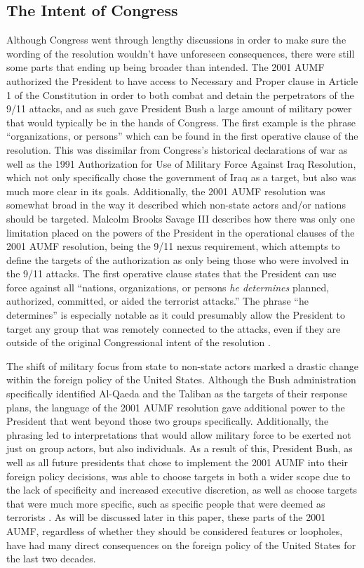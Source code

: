 \documentclass[12pt]{article}
\begin{document}
\subsection*{The Intent of Congress}
Although Congress went through lengthy discussions in order to make sure the wording of the resolution wouldn't have unforeseen consequences, there were still some parts that ending up being broader than intended.
The 2001 AUMF authorized the President to have access to Necessary and Proper clause in Article 1 of the Constitution in order to both combat and detain the perpetrators of the 9/11 attacks, and as such gave President Bush a large amount of military power that would typically be in the hands of Congress.
The first example is the phrase ``organizations, or persons'' which can be found in the first operative clause of the resolution.
This was dissimilar from Congress's historical declarations of war as well as the 1991 Authorization for Use of Military Force Against Iraq Resolution, which not only specifically chose the government of Iraq as a target, but also was much more clear in its goals.
Additionally, the 2001 AUMF resolution was somewhat broad in the way it described which non-state actors and/or nations should be targeted.
Malcolm Brooks Savage III describes how there was only one limitation placed on the powers of the President in the operational clauses of the 2001 AUMF resolution, being the 9/11 nexus requirement, which attempts to define the targets of the authorization as only being those who were involved in the 9/11 attacks.
The first operative clause states that the President can use force against all ``nations, organizations, or persons \emph{he determines} planned, authorized, committed, or aided the terrorist attacks.''
The phrase ``he determines'' is especially notable as it could presumably allow the President to target any group that was remotely connected to the attacks, even if they are outside of the original Congressional intent of the resolution \autocite[5]{savage2015}.

The shift of military focus from state to non-state actors marked a drastic change within the foreign policy of the United States.
Although the Bush administration specifically identified Al-Qaeda and the Taliban as the targets of their response plans, the language of the 2001 AUMF resolution gave additional power to the President that went beyond those two groups specifically.
Additionally, the phrasing led to interpretations that would allow military force to be exerted not just on group actors, but also individuals.
As a result of this, President Bush, as well as all future presidents that chose to implement the 2001 AUMF into their foreign policy decisions, was able to choose targets in both a wider scope due to the lack of specificity and increased executive discretion, as well as choose targets that were much more specific, such as specific people that were deemed as terrorists \autocite[3]{weed2015}.
As will be discussed later in this paper, these parts of the 2001 AUMF, regardless of whether they should be considered features or loopholes, have had many direct consequences on the foreign policy of the United States for the last two decades.
\end{document}
